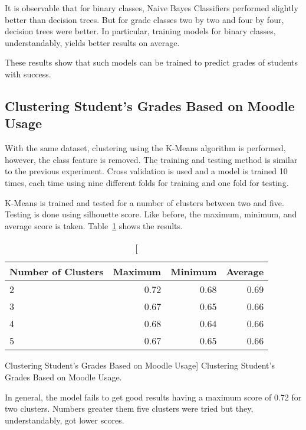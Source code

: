 It is observable that for binary classes, Naive Bayes Classifiers performed
slightly better than decision trees. But for grade classes two by two and four
by four, decision trees were better. In particular, training models for binary
classes, understandably, yields better results on average.

These results show that such models can be trained to predict grades of
students with success.

\subsection{Clustering Student's Grades Based on Moodle Usage}
\label{sec:exp_002}

With the same dataset, clustering using the K-Means algorithm is performed,
however, the class feature is removed. The training and testing method is
similar to the previous experiment. Cross validation is used and a model is
trained 10 times, each time using nine different folds for training and one
fold for testing.

K-Means is trained and tested for a number of clusters between two and five.
Testing is done using silhouette score. Like before, the maximum, minimum, and
average score is taken. Table~\ref{tab:exp_002_res} shows the results.

\begin{table}[h!]
    \centering

    \begin{tabular}{| l | r | r | r |}
        \hline
        \textbf{Number of Clusters} & \textbf{Maximum} & \textbf{Minimum} & \textbf{Average} \\ \hline
        2 & 0.72 & 0.68 & 0.69 \\ \hline
        3 & 0.67 & 0.65 & 0.66 \\ \hline
        4 & 0.68 & 0.64 & 0.66 \\ \hline
        5 & 0.67 & 0.65 & 0.66 \\ \hline
    \end{tabular}

    \caption
        [Clustering Student's Grades Based on Moodle Usage]
        {Clustering Student's Grades Based on Moodle Usage.}

    \label{tab:exp_002_res}
\end{table}

In general, the model fails to get good results having a maximum score of 0.72
for two clusters. Numbers greater them five clusters were tried but they,
understandably, got lower scores.


